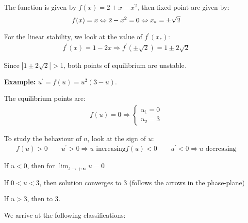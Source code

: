 \noindent The function is given by $f(x) = 2+x-x^2$, then fixed point are given by:
\begin{equation*}
  \begin{gathered}
    f(x) = x\Leftrightarrow 2-x^2 = 0\Leftrightarrow x_* = \pm\sqrt{2}
  \end{gathered}
\end{equation*}
\par\bigskip
\noindent For the linear stability, we look at the value of $f^{\prime}(x_*)$:
\begin{equation*}
  \begin{gathered}
    f^{\prime}(x) = 1-2x\Rightarrow f^{\prime}(\pm\sqrt{2}) = 1\pm2\sqrt{2}
  \end{gathered}
\end{equation*}\par
\noindent Since $\left|1\pm2\sqrt{2}\right|>1$, both points of equilibrium are unstable. 
\par\bigskip
\noindent\textbf{Example:} $u^{\prime} = f(u) = u^2(3-u)$.\par
\noindent The equilibrium points are:
\begin{equation*}
  \begin{gathered}
    f(u) = 0\Rightarrow\begin{cases}u_1=0\\u_2=3\end{cases}
  \end{gathered}
\end{equation*}
\par\bigskip
\noindent To study the behaviour of $u$, look at the sign of $u$:
\begin{equation*}
  \begin{gathered}
    f(u)>0\qquad u^{\prime}>0\Rightarrow u\text{ increasing}
    f(u)<0\qquad u^{\prime}<0\Rightarrow u\text{ decreasing}
  \end{gathered}
\end{equation*}
\par\bigskip
\noindent If $u<0$, then for $\lim_{t\to+\infty} u =0$\par
\noindent If $0<u<3$, then solution converges to 3 (follows the arrows in the phase-plane)\par
\noindent If $u>3$, then to 3.
\par\bigskip
\noindent We arrive at the following classifications:

